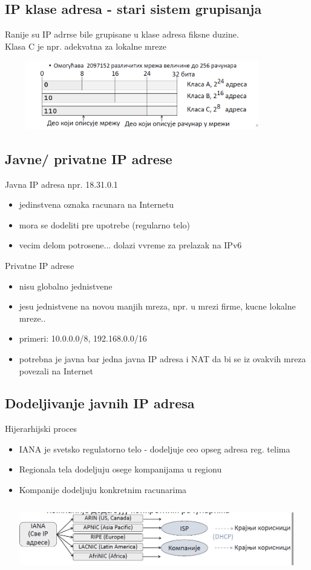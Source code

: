 \documentclass{article} %
\begin{document}
\subsection{IP klase adresa - stari sistem grupisanja}

 Ranije su IP adrrse bile grupisane u klase adresa fiksne duzine.\\
Klasa C je npr. adekvatna za lokalne mreze 
\begin{center}
\includegraphics[width=12cm, height=3cm]{ranije}\\
\end{center}
\subsection{Javne/ privatne IP adrese}
Javna IP adresa npr. 18.31.0.1
\begin{itemize}
  \item jedinstvena oznaka racunara na Internetu
\item mora se dodeliti pre upotrebe (regularno telo)
\item vecim delom potrosene... dolazi vvreme za prelazak na IPv6
\end{itemize}
Privatne IP adrese
\begin{itemize}
  \item nisu globalno jednistvene
\item jesu jednistvene na novou manjih mreza, npr. u mrezi firme, kucne lokalne mreze..
\item primeri: 10.0.0.0/8, 192.168.0.0/16
\item potrebna je javna bar jedna javna IP adresa i NAT da bi se iz ovakvih mreza povezali na Internet
\end{itemize}
\subsection{Dodeljivanje javnih IP adresa}
Hijerarhijski proces
\begin{itemize}
  \item IANA je svetsko regulatorno telo  - dodeljuje ceo opseg adresa reg. telima
\item Regionala tela dodeljuju osege kompanijama u regionu
\item Kompanije dodeljuju konkretnim racunarima
 \begin{center}
\includegraphics[width=12cm, height=3cm]{IANA}
\end{center}
\end{itemize}
\end{document}
